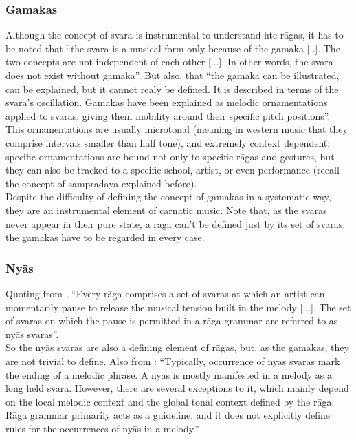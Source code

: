 \subsubsection{Gamakas}


Although the concept of svara is instrumental to understand hte r\=agas, it has to be noted that ``the svara is a musical form only because of the gamaka [..]. The two concepts are not independent of each other [...]. In other words, the svara does not exist without gamaka''\cite[p.51]{krishna}. But also, that ``the gamaka can be illustrated, can be explained, but it cannot realy be defined. It is described in terms of the svara's oscillation. Gamakas have been explained as melodic ornamentations applied to svaras, giving them mobility around their specific pitch positions''\cite[p.51]{krishna}.\\

This ornamentations are usually microtonal (meaning in western music that they comprise intervals smaller than half tone), and extremely context dependent: specific ornamentations are bound not only to specific r\=agas and gestures, but they can also be tracked to a specific school, artist, or even performance (recall the concept of sampradaya explained before).\\

Despite the difficulty of defining the concept of gamakas in a systematic way, they are an instrumental element of carnatic music. Note that, as the svaras never appear in their pure state, a r\=aga can't be defined just by its set of svaras: the gamakas have to be regarded in every case.


\subsubsection{Ny\=as}

Quoting from \cite[p.19]{gulati}, ``Every r\=aga comprises a set of svaras at which an artist can momentarily pause to release the musical tension built in the melody [...]. The set of svaras on which the pause is permitted in a r\=aga grammar are referred to as ny\=as svaras''.\\

So the ny\=as svaras are also a defining element of r\=agas, but, as the gamakas, they are not trivial to define. Also  from \cite[p.19]{gulati}: ``Typically, occurrence of ny\=as svaras mark the ending of a melodic phrase. A ny\=as is mostly manifested in a melody as a long held svara. However, there are several exceptions to it, which mainly depend on the local melodic context and the global tonal context defined by the r\=aga. R\=aga grammar primarily acts as a guideline, and it does not explicitly define rules for the occurrences of ny\=as in a melody.''

